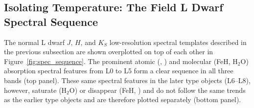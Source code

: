 \documentclass[12pt,preprint]{aastex}
\begin{document}
\subsection{Isolating Temperature: The Field L Dwarf Spectral Sequence}
\label{sec:temp}
The normal L dwarf $J$, $H$, and $K_S$ low-resolution spectral templates described in the previous subsection are shown overplotted on top of each other in Figure~\ref{fig:spec_sequence}. 
The prominent atomic (, ) and molecular (FeH, H$_2$O) absorption spectral features from L0 to L5 form a clear sequence in all three bands (top panel).
These same spectral features in the later type objects (L6--L8), however, saturate (H$_2$O) or disappear (FeH, ) and do not follow the same trends as the earlier type objects and are therefore plotted separately (bottom panel).

\end{document}
